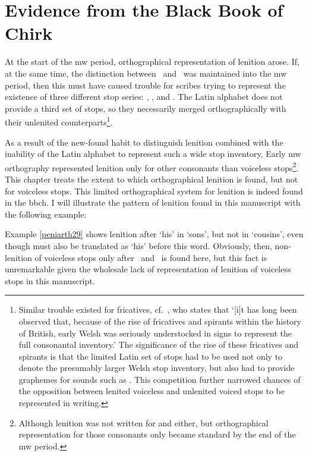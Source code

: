  \chapter{Evidence from the Black Book of Chirk}\label{chirk}
At the start of the \gls{mw} period, orthographical representation of lenition arose. If, at the same time, the distinction between \lT\ and \xD\ was maintained into the \gls{mw} period, then this must have caused trouble for scribes trying to represent the existence of three different stop series: \xT, \lT, and \xD. The Latin alphabet does not provide a third set of stops, so they necessarily merged orthographically with their unlenited counterparts\footnote{Similar trouble existed for fricatives, cf.\ \textcite[28]{russell_rowynniauc_2003}, who states that `[i]t has long been observed that, because of the rise of fricatives and spirants within the history of British, early Welsh was seriously understocked in signs to represent the full consonantal inventory.' The significance of the rise of these fricatives and spirants is that the limited Latin set of stops had to be used not only to denote the presumably larger Welsh stop inventory, but also had to provide graphemes for sounds such as \lT. This competition further narrowed chances of the opposition between lenited voiceless and unlenited voiced stops to be represented in writing.}. 

As a result of the new-found habit to distinguish lenition combined with the inability of the Latin alphabet to represent such a wide stop inventory, Early \gls{mw} orthography represented lenition only for other consonants than voiceless stops\footnote{Although lenition was not written for  and  either, but orthographical representation for those consonants only became standard by the end of the \gls{mw} period.}. This chapter treats the extent to which orthographical lenition is found, but not for voiceless stops. This limited orthographical system for lenition is indeed found in the \gls{bbch}. I will illustrate the pattern of lenition found in this manuscript with the following example: 


Example \ref{peniarth29} shows lenition after  `his' in  `sons', but not in  `cousins', even though  must also be translated as `his' before this word. Obviously, then, non-lenition of voiceless stops only after \ei\ and \oes\ is found here, but this fact is unremarkable given the wholesale lack of representation of lenition of voiceless stops in this manuscript. 

